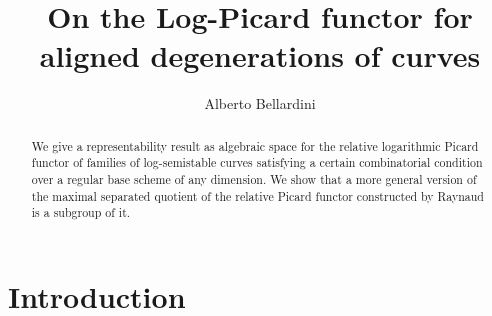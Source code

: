 \documentclass{amsart}
\theoremstyle{definition}
\numberwithin{equation}{section}
\begin{document}
\title{On the Log-Picard functor for aligned degenerations of curves}
\author{Alberto Bellardini}
\address{KU Leuven Department of Mathematics\\
Celestijnenlaan 200B - box 2400\\
3001 Leuven\\
Belgium}
\begin{abstract}
We give a representability result as algebraic space for the relative logarithmic Picard functor of families of log-semistable curves satisfying a certain combinatorial condition over a regular base scheme of any dimension. We show that a more general version of the maximal separated quotient of the relative Picard functor constructed by Raynaud is a subgroup of it.
\end{abstract}
 \maketitle

\tableofcontents

\section*{Introduction}
\end{document}
